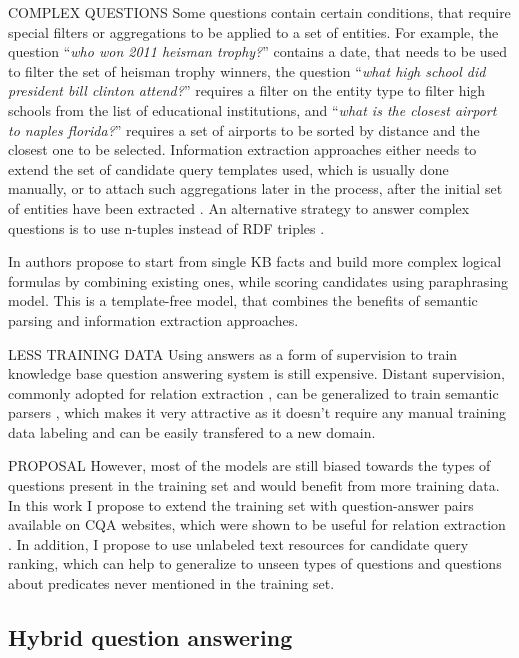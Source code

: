 COMPLEX QUESTIONS
Some questions contain certain conditions, that require special filters or aggregations to be applied to a set of entities. 
For example, the question ``\textit{who won 2011 heisman trophy?}'' contains a date, that needs to be used to filter the set of heisman trophy winners, the question ``\textit{what high school did president bill clinton attend?}'' requires a filter on the entity type to filter high schools from the list of educational institutions, and ``\textit{what is the closest airport to naples florida?}'' requires a set of airports to be sorted by distance and the closest one to be selected.
Information extraction approaches either needs to extend the set of candidate query templates used, which is usually done manually, or to attach such aggregations later in the process, after the initial set of entities have been extracted \cite{yih:ACL:2015:STAGG}.
An alternative strategy to answer complex questions is to use n-tuples instead of RDF triples \cite{yin2015answering}.

In \cite{wang2015large} authors propose to start from single KB facts and build more complex logical formulas by combining existing ones, while scoring candidates using paraphrasing model.
This is a template-free model, that combines the benefits of semantic parsing and information extraction approaches.

LESS TRAINING DATA
Using answers as a form of supervision to train knowledge base question answering system is still expensive.
Distant supervision, commonly adopted for relation extraction \cite{MintzBSJ09}, can be generalized to train semantic parsers \cite{ReddyLS14}, which makes it very attractive as it doesn't require any manual training data labeling and can be easily transfered to a new domain.

PROPOSAL
However, most of the models are still biased towards the types of questions present in the training set and would benefit from more training data.
In this work I propose to extend the training set with question-answer pairs available on CQA websites, which were shown to be useful for relation extraction \cite{SavenkovLDA15}.
In addition, I propose to use unlabeled text resources for candidate query ranking, which can help to generalize to unseen types of questions and questions about predicates never mentioned in the training set.


\subsection{Hybrid question answering}

